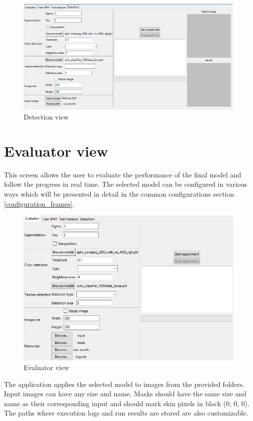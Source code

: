 \documentclass[12pt]{report}
\begin{document}
	\begin{figure}[h!]
		\centering
		\includegraphics[width=\linewidth]{manual/detection_view.png}
		\caption{Detection view}
	\end{figure}

	\section{Evaluator view}
	
	This screen allows the user to evaluate the performance of the final model and follow the progress in real time. The selected model can be configured in various ways which will be presented in detail in the common configurations section \ref{configuration_frames}.
	
	\begin{figure}[h!]
		\centering
		\includegraphics[width=\linewidth]{manual/evaluator_view.png}
		\caption{Evaluator view}
	\end{figure}

	The application applies the selected model to images from the provided folders. Input images can have any size and name. Masks should have the same size and name as their corresponding input and should mark skin pixels in black (0, 0, 0). The paths where execution logs and run results are stored are also customizable.
	
\end{document}
